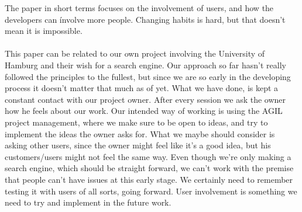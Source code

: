 \documentclass[a4paper]{article}
\begin{document}
The paper in short terms focuses on the involvement of users, and how the developers can ínvolve more people. Changing habits is hard, but that doesn't mean it is impossible. 
\\
\\
This paper can be related to our own project involving the University of Hamburg and their wish for a search engine. Our approach so far hasn't really followed the principles to the fullest, but since we are so early in the developing process it doesn't matter that much as of yet. What we have done, is kept a constant contact with our project owner. After every session we ask the owner how he feels about our work. Our intended way of working is using the AGIL project management, where we make sure to be open to ideas, and try to implement the ideas the owner asks for. What we maybe should consider is asking other users, since the owner might feel like it's a good idea, but his customers/users might not feel the same way. Even though we're only making a search engine, which should be straight forward, we can't work with the premise that people can't have issues at this early stage. We certainly need to remember testing it with users of all sorts, going forward. User involvement is something we need to try and implement in the future work. 
\newpage
\end{document}
